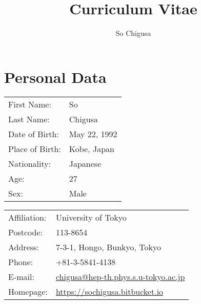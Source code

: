 \documentclass[12pt]{article}
\title{\vspace{-2cm}\textbf{Curriculum Vitae}}
\author{So Chigusa}
\begin{document}
\large
\maketitle

\newcommand{\lsim}{\stackrel{<}{_\sim}}
\newcommand{\gsim}{\stackrel{>}{_\sim}}

\newcommand{\rem}[1]{{$\spadesuit$\bf #1$\spadesuit$}}


\renewcommand{\thefootnote}{\arabic{footnote})}
\setcounter{footnote}{0}

\vspace{-5mm}
\section*{Personal Data}

\vspace{-3mm}

\begin{table}[h]
 \begin{tabular}{ll}
  First Name: & So %
      \\
  Last Name: & Chigusa %
      \\
  Date of Birth: & May 22, 1992 \\
  Place of Birth: & Kobe, Japan \\
  Nationality: & Japanese \\
  Age: & 27 \\
  Sex: & Male \\
 \end{tabular}
\end{table}

\vspace{-5mm}
\begin{table}[h]
 \begin{tabular}{ll}
  Affiliation: & University of Tokyo \\
  Postcode: & 113-8654 \\
  Address: & 7-3-1, Hongo, Bunkyo, Tokyo \\
  Phone: & +81-3-5841-4138 \\
  E-mail: &
      \href{mailto:chigusa@hep-th.phys.s.u-tokyo.ac.jp}{chigusa@hep-th.phys.s.u-tokyo.ac.jp}
      \\
  Homepage: & \url{https://sochigusa.bitbucket.io} \\
 \end{tabular}
\end{table}
\end{document}
